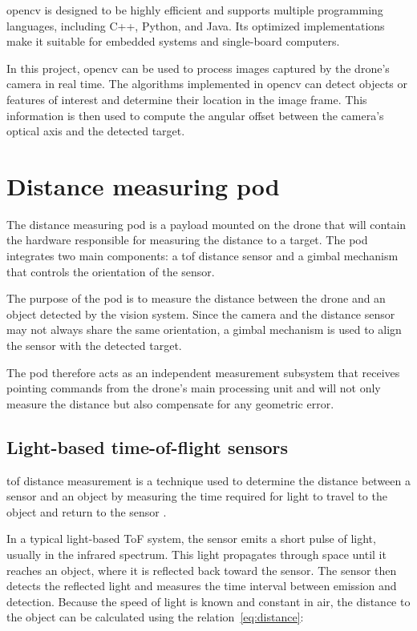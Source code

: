 \gls{opencv} is designed to be highly efficient and supports multiple programming languages,
including C++, Python, and Java. Its optimized implementations make it suitable for embedded
systems and single-board computers.

In this project, \gls{opencv} can be used to process images captured by the drone's camera
in real time. The algorithms implemented in \gls{opencv} can detect objects or features of
interest and determine their location in the image frame. This information is then used to
compute the angular offset between the camera's optical axis and the detected target.

\section{Distance measuring pod}

The distance measuring pod is a payload mounted on the drone that will contain the hardware
responsible for measuring the distance to a target. The pod integrates two main components:
a \gls{tof} distance sensor and a gimbal mechanism that controls the orientation of the
sensor.

The purpose of the pod is to measure the distance between the drone and an object detected
by the vision system. Since the camera and the distance sensor may not always share the
same orientation, a gimbal mechanism is used to align the sensor with the detected target.

The pod therefore acts as an independent measurement subsystem that receives pointing
commands from the drone's main processing unit and will not only measure the distance
but also compensate for any geometric error.

\subsection{Light-based time-of-flight sensors}

\gls{tof} distance measurement is a technique used to determine the distance between a
sensor and an object by measuring the time required for light to travel to the object and
return to the sensor \cite{tof1}.

In a typical light-based ToF system, the sensor emits a short pulse of light, usually in
the infrared spectrum. This light propagates through space until it reaches an object,
where it is reflected back toward the sensor. The sensor then detects the reflected light
and measures the time interval between emission and detection. Because the speed
of light is known and constant in air, the distance to the object can be calculated using
the relation~\ref{eq:distance}:

